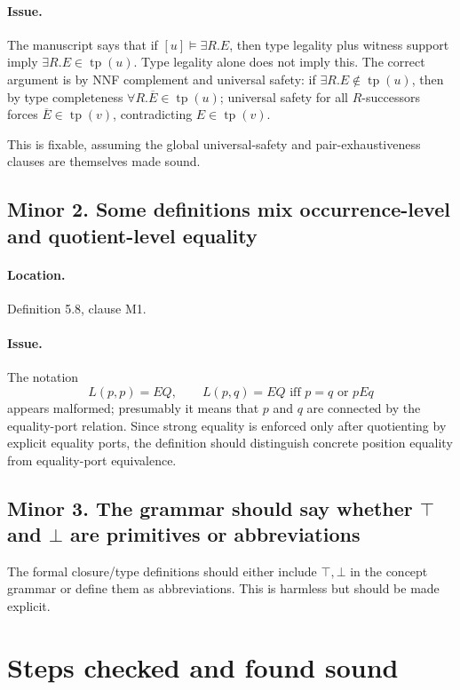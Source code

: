 \documentclass[11pt]{article}
\newcommand{\tp}{\operatorname{tp}}
\newcommand{\Top}{\top}
\newcommand{\Bot}{\bot}
\begin{document}
\paragraph{Issue.} The manuscript says that if $[u]\models \exists R.E$, then type legality plus witness support imply $\exists R.E\in\tp(u)$. Type legality alone does not imply this. The correct argument is by NNF complement and universal safety: if $\exists R.E\notin\tp(u)$, then by type completeness $\forall R.\overline E\in\tp(u)$; universal safety for all $R$-successors forces $\overline E\in\tp(v)$, contradicting $E\in\tp(v)$.

This is fixable, assuming the global universal-safety and pair-exhaustiveness clauses are themselves made sound.

\subsection*{Minor 2. Some definitions mix occurrence-level and quotient-level equality}

\paragraph{Location.} Definition 5.8, clause M1.

\paragraph{Issue.} The notation
\[
  L(p,p)=EQ,
  \qquad
  L(p,q)=EQ \text{ iff } p=q \text{ or } pEq
\]
appears malformed; presumably it means that $p$ and $q$ are connected by the equality-port relation. Since strong equality is enforced only after quotienting by explicit equality ports, the definition should distinguish concrete position equality from equality-port equivalence.

\subsection*{Minor 3. The grammar should say whether $\Top$ and $\Bot$ are primitives or abbreviations}

The formal closure/type definitions should either include $\Top,\Bot$ in the concept grammar or define them as abbreviations. This is harmless but should be made explicit.

\section{Steps checked and found sound}
\end{document}
